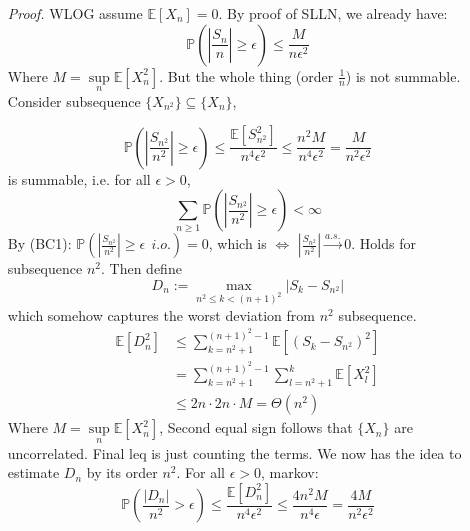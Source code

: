 \documentclass[a4paper,12pt,twoside]{book}
\begin{document}
\begin{itemize}
	\item[\textit{Proof.}] WLOG assume $\mathbb{E}\left[X_n\right]=0$. By proof of SLLN, we already have:
	\begin{equation}
		\mathbb{P}\left(\left|\frac{S_n}{n}\right|\geq \epsilon\right)\leq \frac{M}{n \epsilon^2}
	\end{equation}
	Where $M=\sup\limits_{n} \mathbb{E}\left[X^2_n\right]$. But the whole thing (order $\frac{1}{n}$) is not summable. Consider subsequence $\{X_{n^2}\} \subseteq \{X_n\}$,

	\begin{equation}
		\mathbb{P}\left(\left|\frac{S_{n^2}}{n^2}\right|\geq \epsilon\right)\leq \frac{\mathbb{E}\left[S^2_{n^2}\right]}{n^4 \epsilon^2}\leq\frac{n^2M}{n^4\epsilon^2}=\frac{M}{n^2\epsilon^2}
	\end{equation}
	is summable, i.e. for all $\epsilon>0$,
	\begin{equation}
		\sum_{n\geq1} \mathbb{P}\left(\left|\frac{S_{n^2}}{n^2}\right|\geq \epsilon\right) < \infty
	\end{equation}
	By (BC1): $\mathbb{P}\left(\left|\frac{S_{n^2}}{n^2}\right|\geq \epsilon~~i.o.\right)=0$, which is $\iff$ $\left|\frac{S_{n^2}}{n^2}\right| \xrightarrow{a.s.} 0$. Holds for subsequence $n^2$. \newline
	Then define
	\begin{equation}
	 	D_n:=\max\limits_{n^2 \leq k < (n+1)^2} |S_k - S_{n^2}|
	\end{equation} 
	which somehow captures the worst deviation from $n^2$ subsequence.
	\begin{equation}
		\begin{split}
			\mathbb{E}\left[D_n^2\right]&\leq \sum_{k=n^2+1}^{(n+1)^2-1} \mathbb{E}\left[(S_k-S_{n^2})^2\right]\\
			&=\sum_{k=n^2+1}^{(n+1)^2-1} \sum_{l=n^2+1}^{k} \mathbb{E}\left[X_l^2\right]\\
			&\leq 2n \cdot 2n \cdot M = \Theta(n^2)
		\end{split}
	\end{equation}
	Where $M=\sup\limits_{n} \mathbb{E}\left[X^2_n\right]$, Second equal sign follows that $\{X_n\}$ are uncorrelated. Final leq is just counting the terms. We now has the idea to estimate $D_n$ by its order $n^2$. For all $\epsilon>0$, markov:
	\begin{equation}
		\mathbb{P}\left(\frac{|D_n|}{n^2}>\epsilon\right)\leq \frac{\mathbb{E}\left[D_n^2\right]}{n^4 \epsilon^2}\leq \frac{4n^2M}{n^4 \epsilon}=\frac{4M}{n^2\epsilon^2}

\end{equation}
\end{itemize}
\end{document}
